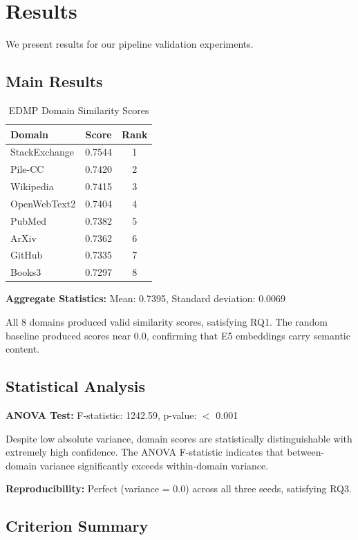 \section{Results}
\label{sec:results}

We present results for our pipeline validation experiments.

\subsection{Main Results}

\begin{table}[h]
\centering
\caption{EDMP Domain Similarity Scores}
\label{tab:scores}
\begin{tabular}{@{}lcc@{}}
\toprule
Domain & Score & Rank \\
\midrule
StackExchange & 0.7544 & 1 \\
Pile-CC & 0.7420 & 2 \\
Wikipedia & 0.7415 & 3 \\
OpenWebText2 & 0.7404 & 4 \\
PubMed & 0.7382 & 5 \\
ArXiv & 0.7362 & 6 \\
GitHub & 0.7335 & 7 \\
Books3 & 0.7297 & 8 \\
\bottomrule
\end{tabular}
\end{table}

\textbf{Aggregate Statistics:} Mean: 0.7395, Standard deviation: 0.0069

All 8 domains produced valid similarity scores, satisfying RQ1. The random baseline produced scores near 0.0, confirming that E5 embeddings carry semantic content.

\subsection{Statistical Analysis}

\textbf{ANOVA Test:} F-statistic: 1242.59, p-value: $<$ 0.001

Despite low absolute variance, domain scores are statistically distinguishable with extremely high confidence. The ANOVA F-statistic indicates that between-domain variance significantly exceeds within-domain variance.

\textbf{Reproducibility:} Perfect (variance = 0.0) across all three seeds, satisfying RQ3.

\subsection{Criterion Summary}

